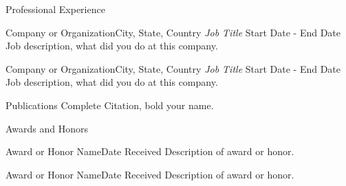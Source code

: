 \documentclass[10pt, letterpaper]{article}
\begin{document}
    \begin{resumesection}{Professional Experience}
        
        \begin{resumesubsection}{Company or Organization}{City, State, Country}
            \textit{Job Title} \normalsize \hfill Start Date - End Date \newline
            Job description, what did you do at this company.
        
            
        \end{resumesubsection}
    
        \begin{resumesubsection}{Company or Organization}{City, State, Country}
            \textit{Job Title} \normalsize \hfill Start Date - End Date \newline
            Job description, what did you do at this company.
        
            
        \end{resumesubsection}     

    \end{resumesection}

    \begin{resumesection}{Publications}
        Complete Citation, bold your name.       
    \end{resumesection}    

    \begin{resumesection}{Awards and Honors}
    
        \begin{resumesubsection}{Award or Honor Name}{Date Received} 
            Description of award or honor.
        \end{resumesubsection}
    
        \begin{resumesubsection}{Award or Honor Name}{Date Received} 
            Description of award or honor.
        \end{resumesubsection}
    
    \end{resumesection}
\end{document}
